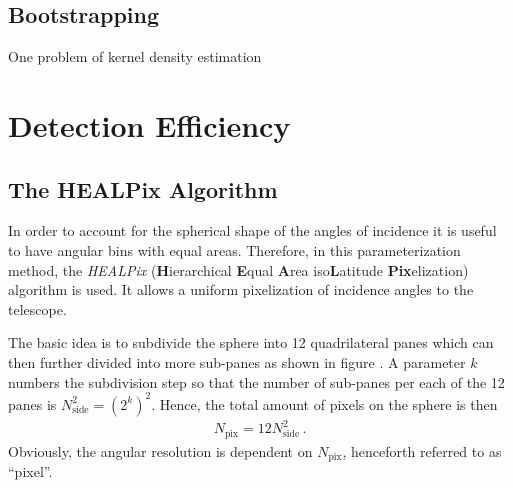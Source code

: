 \subsection{Bootstrapping}
One problem of kernel density estimation 

\section{Detection Efficiency}

\subsection{The HEALPix Algorithm}

In order to account for the spherical shape of the angles of incidence it is useful to have angular bins with equal areas. Therefore, in this parameterization method, the \textit{HEALPix} (\textbf{H}ierarchical \textbf{E}qual \textbf{A}rea iso\textbf{L}atitude \textbf{Pix}elization) algorithm is used. It allows a uniform pixelization of incidence angles to the telescope.\\


The basic idea is to subdivide the sphere into 12 quadrilateral panes which can then further divided into more sub-panes as shown in figure . A parameter $k$ numbers the subdivision step so that the number of sub-panes per each of the 12 panes is $N_{\text{side}}^2=\left(2^k\right)^2$. Hence, the total amount of pixels on the sphere is then
\begin{align}
N_\text{pix} = 12N_\text{side}^2\,.
\end{align}
Obviously, the angular resolution is dependent on $N_\text{pix}$, henceforth referred to as \enquote{pixel}.

